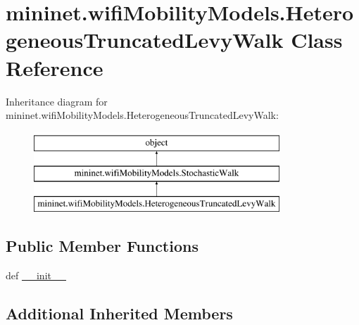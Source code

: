 \hypertarget{classmininet_1_1wifiMobilityModels_1_1HeterogeneousTruncatedLevyWalk}{\section{mininet.\-wifi\-Mobility\-Models.\-Heterogeneous\-Truncated\-Levy\-Walk Class Reference}
\label{classmininet_1_1wifiMobilityModels_1_1HeterogeneousTruncatedLevyWalk}
}
Inheritance diagram for mininet.\-wifi\-Mobility\-Models.\-Heterogeneous\-Truncated\-Levy\-Walk\-:\begin{figure}[H]
\begin{center}
\leavevmode
\includegraphics[height=3.000000cm]{classmininet_1_1wifiMobilityModels_1_1HeterogeneousTruncatedLevyWalk}
\end{center}
\end{figure}
\subsection*{Public Member Functions}
\begin{DoxyCompactItemize}
\item 
def \hyperlink{classmininet_1_1wifiMobilityModels_1_1HeterogeneousTruncatedLevyWalk_ac62818e40549480321577341bc96efe4}{\-\_\-\-\_\-init\-\_\-\-\_\-}
\end{DoxyCompactItemize}
\subsection*{Additional Inherited Members}


